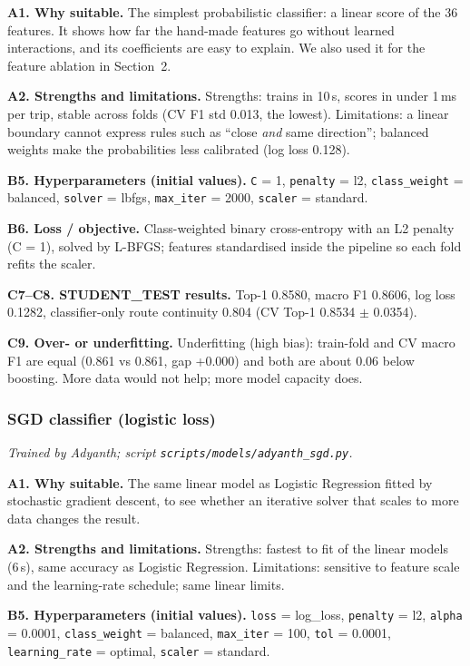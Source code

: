 \documentclass[11pt,a4paper]{article}
\begin{document}
\textbf{A1. Why suitable.} The simplest probabilistic classifier: a linear score of the 36 features. It shows how far the hand-made features go without learned interactions, and its coefficients are easy to explain. We also used it for the feature ablation in Section~2.

\textbf{A2. Strengths and limitations.} Strengths: trains in 10\,s, scores in under 1\,ms per trip, stable across folds (CV F1 std 0.013, the lowest). Limitations: a linear boundary cannot express rules such as ``close \emph{and} same direction''; balanced weights make the probabilities less calibrated (log loss 0.128).

\textbf{B5. Hyperparameters (initial values).} \texttt{C} = 1, \texttt{penalty} = l2, \texttt{class\_weight} = balanced, \texttt{solver} = lbfgs, \texttt{max\_iter} = 2000, \texttt{scaler} = standard.

\textbf{B6. Loss / objective.} Class-weighted binary cross-entropy with an L2 penalty (C = 1), solved by L-BFGS; features standardised inside the pipeline so each fold refits the scaler.

\textbf{C7--C8. STUDENT\_TEST results.} Top-1 0.8580, macro F1 0.8606, log loss 0.1282, classifier-only route continuity 0.804 (CV Top-1 0.8534 $\pm$ 0.0354).

\textbf{C9. Over- or underfitting.} Underfitting (high bias): train-fold and CV macro F1 are equal (0.861 vs 0.861, gap +0.000) and both are about 0.06 below boosting. More data would not help; more model capacity does.
\subsubsection{SGD classifier (logistic loss)}
\textit{Trained by Adyanth; script \texttt{scripts/models/adyanth\_sgd.py}.}

\textbf{A1. Why suitable.} The same linear model as Logistic Regression fitted by stochastic gradient descent, to see whether an iterative solver that scales to more data changes the result.

\textbf{A2. Strengths and limitations.} Strengths: fastest to fit of the linear models (6\,s), same accuracy as Logistic Regression. Limitations: sensitive to feature scale and the learning-rate schedule; same linear limits.

\textbf{B5. Hyperparameters (initial values).} \texttt{loss} = log\_loss, \texttt{penalty} = l2, \texttt{alpha} = 0.0001, \texttt{class\_weight} = balanced, \texttt{max\_iter} = 100, \texttt{tol} = 0.0001, \texttt{learning\_rate} = optimal, \texttt{scaler} = standard.
\end{document}
